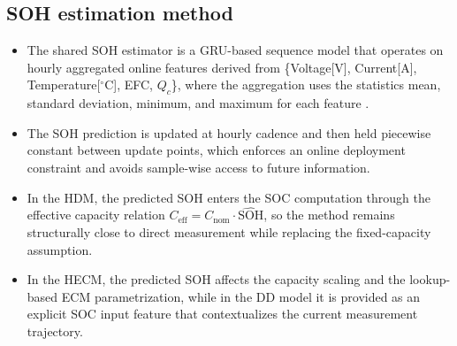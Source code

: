 \documentclass[review]{elsarticle}
\begin{document}
\subsection{SOH estimation method}
\begin{itemize}[leftmargin=*]
    \item The shared SOH estimator is a GRU-based sequence model that operates on hourly aggregated online features derived from \{Voltage[V], Current[A], Temperature[$^\circ$C], EFC, $Q_c$\}, where the aggregation uses the statistics mean, standard deviation, minimum, and maximum for each feature \cite{Embedded_AI_SOH_badData,gouEnsembleLearningBasedDataDriven2021,liOnlineCapacityEstimation2021,rzepkaNeuralNetworkArchitecture2023a}.
    \item The SOH prediction is updated at hourly cadence and then held piecewise constant between update points, which enforces an online deployment constraint and avoids sample-wise access to future information.
    \item In the HDM, the predicted SOH enters the SOC computation through the effective capacity relation $C_{\mathrm{eff}} = C_{\mathrm{nom}} \cdot \widehat{\mathrm{SOH}}$, so the method remains structurally close to direct measurement while replacing the fixed-capacity assumption.
    \item In the HECM, the predicted SOH affects the capacity scaling and the lookup-based ECM parametrization, while in the DD model it is provided as an explicit SOC input feature that contextualizes the current measurement trajectory.
\end{itemize}
\end{document}
